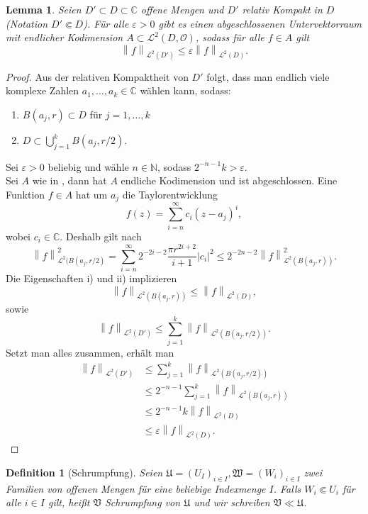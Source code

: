 \documentclass[11pt,a4paper,toc=bibliography]{scrartcl}
\theoremstyle{thm}
\newtheorem{lemma}{Lemma}[section]
\theoremstyle{def}
\newtheorem{defi}{Definition}[section]
\theoremstyle{remark}
\newcommand{\norm}[1]{\left\lVert#1\right\rVert}
\begin{document}
\begin{lemma}
Seien $D' \subset D\subset \mathbb{C}$ offene Mengen und $D'$ relativ Kompakt in $D$ (Notation $D'\Subset D$). Für alle $\varepsilon >0$ gibt es einen abgeschlossenen Untervektorraum mit endlicher Kodimension $A\subset \mathcal{L}^2(D,\mathcal{O})$, sodass für alle $f\in A$ gilt
\[
\norm{f}_{\mathcal{L}^2(D')} \leq \varepsilon \norm{f}_{\mathcal{L}^2(D)}.
\]
\end{lemma}
\begin{proof}
Aus der relativen Kompaktheit von $D'$ folgt, dass man endlich viele komplexe Zahlen $a_1,\ldots,a_k\in\mathbb{C}$ wählen kann, sodass:
\begin{enumerate}
\item $B(a_j,r)\subset D$ für $j=1,\ldots,k$
\item  $D\subset\bigcup_{j=1}^k B(a_j,r/2)$.
\end{enumerate}
Sei $\varepsilon>0$ beliebig und wähle $n\in\mathbb{N}$, sodass $2^{-n-1}k>\varepsilon$.\\
Sei $A$ wie in , dann hat $A$ endliche Kodimension und ist abgeschlossen. Eine Funktion $f\in A$ hat um $a_j$ die Taylorentwicklung 
\[
f(z)=\sum_{i=n}^{\infty} c_i(z-a_j)^i,
\]
wobei $c_i\in\mathbb{C}$. Deshalb gilt nach 
\[
\norm{f}_{\mathcal{L}^2(B(a_j,r/2)}^2=\sum_{i=n}^{\infty}2^{-2i-2}\frac{\pi r^{2i+2}}{i+1}|c_i|^2\leq 2^{-2n-2}\norm{f}_{\mathcal{L}^2(B(a_j,r))}^2.
\]
Die Eigenschaften i) und ii) implizieren
\[
\norm{f}_{\mathcal{L}^2(B(a_j,r))}\leq \norm{f}_{\mathcal{L}^2(D)},
\]
sowie
\[
\norm{f}_{\mathcal{L}^2(D')}\leq \sum_{j=1}^{k}\norm{f}_{\mathcal{L}^2(B(a_j,r/2))}.
\]
Setzt man alles zusammen, erhält man
\begin{align*}
    \norm{f}_{\mathcal{L}^2(D')} & \leq \sum_{j=1}^{k}\norm{f}_{\mathcal{L}^2(B(a_j,r/2))}\\
                                &\leq 2^{-n-1}\sum_{j=1}^{k}\norm{f}_{\mathcal{L}^2(B(a_j,r))}\\
                                &\leq 2^{-n-1}k \norm{f}_{\mathcal{L}^2(D)}\\
                                &\leq \varepsilon \norm{f}_{\mathcal{L}^2(D)}.
\end{align*}


\end{proof}

\begin{defi}[Schrumpfung]
Seien $\mathfrak{U}=(U_I)_{i\in I},\mathfrak{W}=(W_i)_{i\in I}$ zwei Familien von offenen Mengen für eine beliebige Indexmenge $I$. Falls $W_i\Subset U_i$ für alle $i\in I$ gilt, heißt $\mathfrak{V}$ \emph{Schrumpfung} von $\mathfrak{U}$ und wir schreiben $\mathfrak{V}\ll\mathfrak{U}$.
\end{defi}
\end{document}
